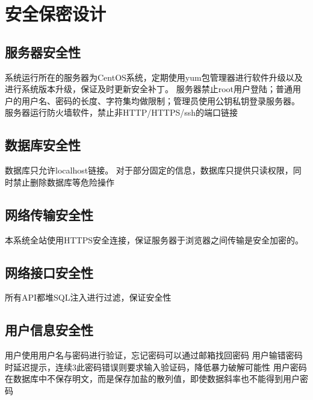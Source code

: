 \chapter{安全保密设计}

    \section{服务器安全性}
        系统运行所在的服务器为CentOS系统，定期使用yum包管理器进行软件升级以及进行系统版本升级，保证及时更新安全补丁。
        服务器禁止root用户登陆；普通用户的用户名、密码的长度、字符集均做限制；管理员使用公钥私钥登录服务器。
        服务器运行防火墙软件，禁止非HTTP/HTTPS/ssh的端口链接
    \section{数据库安全性}
        数据库只允许localhost链接。
        对于部分固定的信息，数据库只提供只读权限，同时禁止删除数据库等危险操作
    \section{网络传输安全性}
        本系统全站使用HTTPS安全连接，保证服务器于浏览器之间传输是安全加密的。
    \section{网络接口安全性}
        所有API都堆SQL注入进行过滤，保证安全性
    \section{用户信息安全性}
        用户使用用户名与密码进行验证，忘记密码可以通过邮箱找回密码
        用户输错密码时延迟提示，连续3此密码错误则要求输入验证码，降低暴力破解可能性
        用户密码在数据库中不保存明文，而是保存加盐的散列值，即使数据斜率也不能得到用户密码
